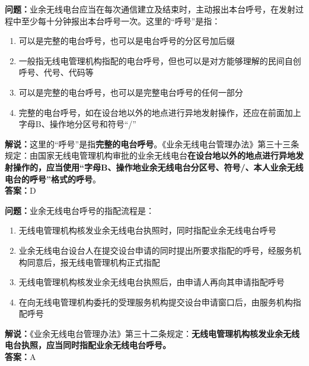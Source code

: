 \documentclass{ctexbook}
\begin{document}
\bigskip


\noindent\textbf{问题：}业余无线电台应当在每次通信建立及结束时，主动报出本台呼号，在发射过程中至少每十分钟报出本台呼号一次。这里的“呼号”是指：
\begin{enumerate}[label=\Alph*), leftmargin=3em]
	\item 可以是完整的电台呼号，也可以是电台呼号的分区号加后缀
	\item 一般指无线电管理机构指配的电台呼号，但也可以是对方能够理解的民间自创呼号、代号、代码等
	\item 可以是完整的电台呼号，也可以是完整电台呼号的任何一部分
	\item 完整的电台呼号，如在设台地以外的地点进行异地发射操作，还应在前面加上字母B、操作地分区号和符号“/”
\end{enumerate}
\noindent\textbf{解说：}这里的“呼号”是指\textbf{完整的电台呼号}。《业余无线电台管理办法》第三十三条规定：由国家无线电管理机构审批的业余无线电台\textbf{在设台地以外的地点进行异地发射操作的，应当使用“字母B、操作地业余无线电台分区号、符号/、本人业余无线电台的呼号”格式的呼号}。\\\noindent\textbf{答案：}D



\bigskip


\noindent\textbf{问题：}业余无线电台呼号的指配流程是：
\begin{enumerate}[label=\Alph*), leftmargin=3em]
	\item 无线电管理机构核发业余无线电台执照时，同时指配业余无线电台呼号
	\item 业余无线电台设台人在提交设台申请的同时提出所要求指配的呼号，经服务机构同意后，报无线电管理机构正式指配
	\item 无线电管理机构核发业余无线电台执照后，由申请人再向其申请指配呼号
	\item 在向无线电管理机构委托的受理服务机构提交设台申请窗口后，由服务机构指配呼号
\end{enumerate}
\noindent\textbf{解说：}《业余无线电台管理办法》第三十二条规定：\textbf{无线电管理机构核发业余无线电台执照，应当同时指配业余无线电台呼号。}\\\noindent\textbf{答案：}A



\bigskip
\end{document}

